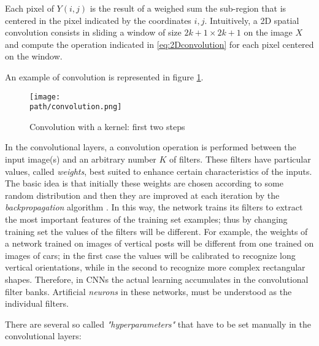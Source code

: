 Each pixel of $ Y(i, j)$ is the result of a weighed sum the sub-region that is centered in the pixel indicated by the coordinates $i,j$. Intuitively, a 2D spatial convolution consists in sliding a window of size $2k+1 \times 2k+1$ on the image $X$ and compute the operation indicated in \ref{eq:2Dconvolution} for each pixel centered on the window. 


An example of convolution is represented in figure \ref{fig:convolution}. 

\begin{figure}[h!]
 \centering
 \texttt{[image: \\path/convolution.png]} 
 \caption{Convolution with a kernel: first two steps}
 \label{fig:convolution}
\end{figure}


In the convolutional layers, a convolution operation is performed between the input image(s) and an arbitrary number $K$ of filters. These filters have particular values, called   \emph{weights},  best suited to enhance certain characteristics of the inputs. 
\\
The basic idea is that initially these weights are chosen according to some random distribution and then they are improved at each iteration by the \emph{backpropagation} algorithm \parencite{backprop}. 
\newline 
In this way, the network trains its filters to extract the most important features of the training set examples; thus by changing training set the values of the filters will be different. For example, the weights of a network trained on images of vertical posts will be different from one trained on images of cars; in the first case the values will be calibrated to recognize long vertical orientations, while in the second to recognize more complex rectangular shapes. Therefore, in CNNs the actual learning accumulates in the convolutional filter banks. Artificial \emph{neurons} in these networks, must be understood as the individual filters.


There are several so called \emph{"hyperparameters"} that have to be set manually in the convolutional layers:


